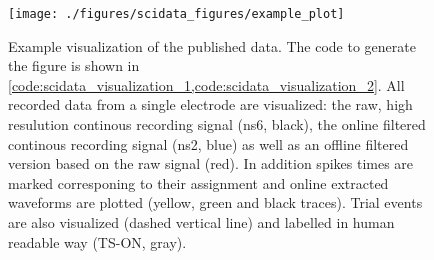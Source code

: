 \begin{figure}
 \texttt{[image: ./figures/scidata\_figures/example\_plot]}
 \caption[Example visualization of the published data]{Example visualization of the published data. The code to generate the figure is shown in \cref{code:scidata_visualization_1,code:scidata_visualization_2}. All recorded data from a single electrode are visualized: the raw, high resulution continous recording signal (ns6, black), the online filtered continous recording signal (ns2, blue) as well as an offline filtered version based on the raw signal (red). In addition spikes times are marked corresponing to their  assignment and online extracted waveforms are plotted (yellow, green and black traces). Trial events are also visualized (dashed vertical line) and labelled in human readable way (TS-ON, gray).}
 \label{fig:scidata_visualization}
\end{figure}

